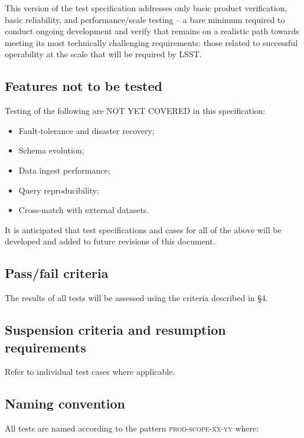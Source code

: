\documentclass[DM,lsstdraft,STS,toc]{lsstdoc}
\begin{document}
This version of the \product{} test specification addresses only basic product verification, basic
reliability, and performance/scale testing -- a bare minimum required to conduct ongoing development 
and verify that \product{} remains on a realistic path towards meeting its most technically challenging
requirements: those related to successful operability at the scale that will be required by LSST.

\subsection{Features not to be tested}
\label{sec:featnot2test}

Testing of the following are NOT YET COVERED in this specification:

\begin{itemize}
  \item{Fault-tolerance and disaster recovery;}
  \item{Schema evolution;}
  \item{Data ingest performance;}
  \item{Query reproducibility;}
  \item{Cross-match with external datasets.}
\end{itemize}

It is anticipated that test specifications and cases for all of the above will be developed
and added to future revisions of this document. 

\subsection{Pass/fail criteria}
\label{sec:passfail}

The results of all tests will be assessed using the criteria described in  \S4.

\subsection{Suspension criteria and resumption requirements}
\label{suspension}

Refer to individual test cases where applicable.

\subsection{Naming convention}

All tests are named according to the pattern \textsc{prod-scope-xx-yy} where:
\end{document}
